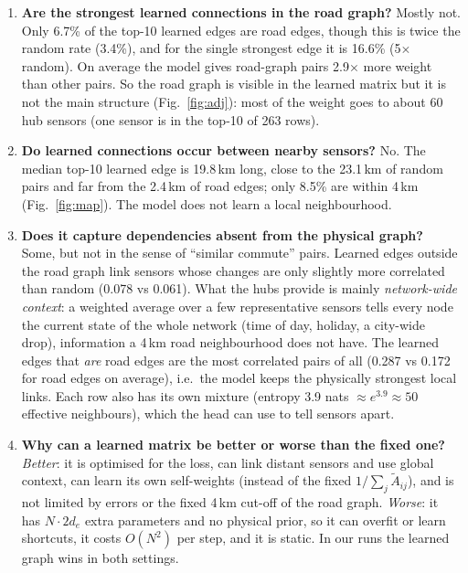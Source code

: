 \begin{enumerate}
\item \textbf{Are the strongest learned connections in the road graph?} Mostly not. Only 6.7\% of the top-10 learned edges are road
edges, though this is twice the random rate (3.4\%), and for the single strongest edge it is 16.6\% (5$\times$ random). On average the
model gives road-graph pairs 2.9$\times$ more weight than other pairs. So the road graph is visible in the learned matrix but it is not
the main structure (Fig.~\ref{fig:adj}): most of the weight goes to about 60 hub sensors (one sensor is in the top-10 of 263 rows).
\item \textbf{Do learned connections occur between nearby sensors?} No. The median top-10 learned edge is 19.8\,km long, close to the
23.1\,km of random pairs and far from the 2.4\,km of road edges; only 8.5\% are within 4\,km (Fig.~\ref{fig:map}). The model does not
learn a local neighbourhood.
\item \textbf{Does it capture dependencies absent from the physical graph?} Some, but not in the sense of ``similar commute'' pairs. Learned
edges outside the road graph link sensors whose changes are only slightly more correlated than random (0.078 vs 0.061). What the hubs
provide is mainly \emph{network-wide context}: a weighted average over a few representative sensors tells every node the current
state of the whole network (time of day, holiday, a city-wide drop), information a 4\,km road neighbourhood does not have. The
learned edges that \emph{are} road edges are the most correlated pairs of all (0.287 vs 0.172 for road edges on average), i.e.\ the model keeps the
physically strongest local links. Each row also has its own mixture (entropy 3.9 nats $\approx e^{3.9}\approx 50$ effective
neighbours), which the head can use to tell sensors apart.
\item \textbf{Why can a learned matrix be better or worse than the fixed one?}
\emph{Better}: it is optimised for the loss, can link distant sensors and use global context, can learn its own self-weights (instead of the fixed $1/\sum_j\tilde A_{ij}$), and is not limited by errors or the fixed 4\,km cut-off of the road graph. \emph{Worse}: it has
$N\cdot 2d_e$ extra parameters and no physical prior, so it can overfit or learn shortcuts, it costs $O(N^2)$ per step, and it is
static. In our runs the learned graph wins in both settings.
\end{enumerate}


